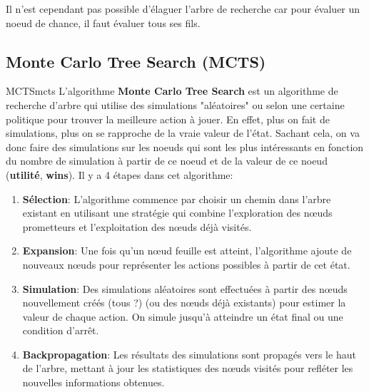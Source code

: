 \begin{note}
    Il n'est cependant pas possible d'élaguer l'arbre de recherche car pour évaluer 
    un noeud de chance, il faut évaluer tous ses fils.
\end{note}



\subsection{Monte Carlo Tree Search (MCTS)} %
\label{sub:monte_carlo}

\begin{definition}{MCTS}{mcts}
    L'algorithme \textbf{Monte Carlo Tree Search} est un algorithme de recherche d'arbre qui utilise des simulations 
    "aléatoires" ou selon une certaine politique pour trouver la meilleure action à jouer. 
    En effet, plus on fait de simulations, plus on se rapproche de la vraie valeur de l'état. 
    Sachant cela, on va donc faire des simulations sur les noeuds qui sont les plus intéressants 
    en fonction du nombre de simulation à partir de ce noeud et de la valeur de ce noeud (\textbf{utilité}, \textbf{wins}).
    Il y a 4 étapes dans cet algorithme: 
    \begin{enumerate}
        \item \textbf{Sélection}:  L'algorithme commence par choisir un chemin dans l'arbre existant 
            en utilisant une stratégie qui combine l'exploration des nœuds prometteurs 
            et l'exploitation des nœuds déjà visités.        
        \item \textbf{Expansion}: Une fois qu'un nœud feuille est atteint, 
            l'algorithme ajoute de nouveaux nœuds pour représenter les actions possibles à partir de cet état.
        \item \textbf{Simulation}: Des simulations aléatoires sont effectuées à partir des nœuds nouvellement créés (tous ?)
            (ou des nœuds déjà existants) pour estimer la valeur de chaque action. 
            On simule  jusqu'à atteindre un état final ou une condition d'arrêt.

      \item \textbf{Backpropagation}: Les résultats des simulations sont propagés vers le haut de  
        l'arbre, mettant à jour les statistiques des nœuds visités pour refléter les nouvelles informations obtenues.
    \end{enumerate}

\end{definition}

